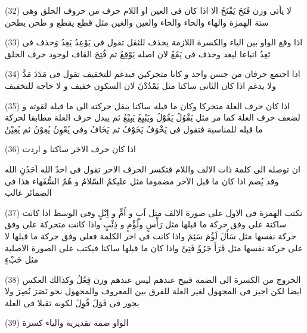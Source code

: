 \begin{twocol}
\begin{rightcol}
(32) لا يأتى وزن فَتَحَ يَفْتَحُ الا اذا كان فى العين او اللام حرف من حروف الحلق وهى ستة الهمزة والهاء والحاء والخاء والعين والغين مثل قطع يقطع و طحن يطحن
\par
(33) اذا وقع الواو بين الياء والكسرة اللازمة يحذف للثقل تقول فى يَوْعِدُ يَعِدُ وَحذف فى تَعِدُ اتباعا ليعد وحذف فى يَقَعُ لان اصله يَوْقِعُ ثم فُتِحَ القاف لوجود حرف الحلق
\par
(34) اذا اجتمع حرفان من جنس واحد و كانا متحركين فيدغم للتخفيف تقول فى مَدَدَ مَدَّ ولا يدغم اذا كان الثانى ساكنا مثل يَمْدُدْنَ لان السكون خفيف و لا حاجة للتخفيف
\par
(35) اذا كان حرف العلة متحركا وكان ما قبله ساكنا ينقل حركته الى ما قبله لقوته و لضعف حرف العلة كما مر مثل يَقْوُلُ يَقُوْلُ ويَبْيِعُ يَبِيْعُ ثم يبدل حرف العلة مطابقا لحركة ما قبله للمناسبة فتقول فى يَخْوَفُ يَخَوْفُ ثم يَخَافُ وفى يُعْوِنُ يُعِوْنُ ثم يُعِيْنُ
\par
(36) اذا كان حرف الاخر ساكنا و اردت
\end{rightcol}
\begin{leftcol}
ان توصله الى كلمة ذات الالف واللام فتكسر الحرف الاخر تقول فى احدٌ الله اَحَدُنِ الله وقد يُضم اذا كان ما قبل الآخر مضموما مثل عليكمُ السّلامُ و هُمُ السُّفَهاء هذا فى الضمائر غالب
\par
(37) تكتب الهمزة فى الاول على صورة الالف مثل اَبٍ و اُمٍّ و اِبْلٍ وفى الوسط اذا كانت ساكنة على وفق حركة ما قبلها مثل رَأْسٍ ولُؤْمٍ و ذِئْبٍ واذا كانت متحركة على وفق حركة نفسها مثل سَأَلَ لَؤُمَ سَئِمَ واذا كانت فى اخر الكلمة فعلى وفق حركة ما قبلها لا على حركة نفسها مثل قَرَأَ جَرُؤَ فَتِئَ واذا كان ما قبلها ساكنا فيكتب على الصورة الاصلية مثل خَبْءٍ
\par
(38) الخروج من الكسرة الى الضمة قبيح عندهم ليس عندهم وزن فِعُلُ وكذالك العكس ايضا لكن اجيز فى المجهول لغير العلة للفرق بين المعروف والمجهول نحو نَصَرَ نُصِرَ ولا يجوز فى قَوَلَ قُوِلَ لكونه ثقيلا فى العلة
\par
(39) الواو ضمة تقديرية والياء كسرة
\end{leftcol}
\end{twocol}
